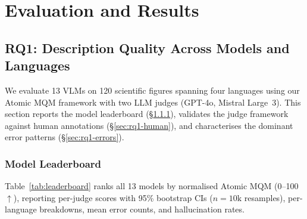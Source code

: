 \chapter{Evaluation and Results}\label{ch:evaluation}

\section{RQ1: Description Quality Across Models and Languages}\label{sec:rq1-results}

We evaluate 13 VLMs on 120 scientific figures spanning four languages using our Atomic MQM framework with two LLM judges (GPT-4o, Mistral Large~3).
This section reports the model leaderboard (\S\ref{sec:rq1-leaderboard}), validates the judge framework against human annotations (\S\ref{sec:rq1-human}), and characterises the dominant error patterns (\S\ref{sec:rq1-errors}).

\subsection{Model Leaderboard}\label{sec:rq1-leaderboard}

Table~\ref{tab:leaderboard} ranks all 13 models by normalised Atomic MQM (0--100$\uparrow$), reporting per-judge scores with 95\% bootstrap CIs ($n{=}10\text{k}$ resamples), per-language breakdowns, mean error counts, and hallucination rates.

